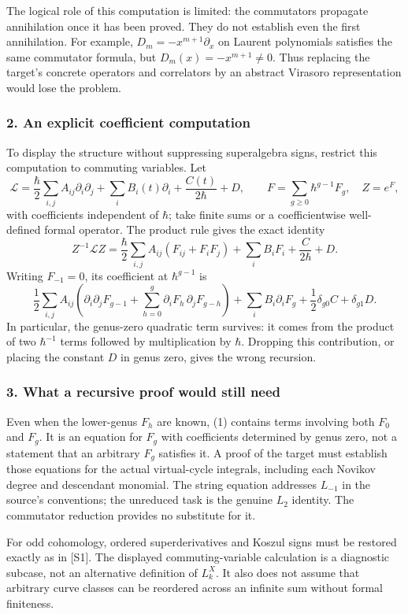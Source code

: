 \documentclass[11pt]{article}
\begin{document}
The logical role of this computation is limited: the commutators propagate annihilation once it has been proved. They do not establish even the first annihilation. For example, $D_m=-x^{m+1}\partial_x$ on Laurent polynomials satisfies the same commutator formula, but $D_m(x)=-x^{m+1}\ne0$. Thus replacing the target's concrete operators and correlators by an abstract Virasoro representation would lose the problem.

\subsubsection{2. An explicit coefficient computation}
To display the structure without suppressing superalgebra signs, restrict this computation to commuting variables. Let
\[\mathcal L=\frac{\hbar}{2}\sum_{i,j}A_{ij}\partial_i\partial_j+
\sum_i B_i(t)\partial_i+\frac{C(t)}{2\hbar}+D,\qquad
F=\sum_{g\ge0}\hbar^{g-1}F_g,\quad Z=e^F,\]
with coefficients independent of $\hbar$; take finite sums or a coefficientwise well-defined formal operator. The product rule gives the exact identity
\[Z^{-1}\mathcal L Z=\frac{\hbar}{2}\sum_{i,j}A_{ij}(F_{ij}+F_iF_j)+\sum_i B_iF_i+
\frac{C}{2\hbar}+D.\]
Writing $F_{-1}=0$, its coefficient at $\hbar^{g-1}$ is
\[\frac12\sum_{i,j}A_{ij}\left(\partial_i\partial_jF_{g-1}+
\sum_{h=0}^{g}\partial_iF_h\,\partial_jF_{g-h}\right)
+\sum_i B_i\partial_iF_g+\frac12\delta_{g0}C+\delta_{g1}D.\tag{1}\]
In particular, the genus-zero quadratic term survives: it comes from the product of two $\hbar^{-1}$ terms followed by multiplication by $\hbar$. Dropping this contribution, or placing the constant $D$ in genus zero, gives the wrong recursion.

\subsubsection{3. What a recursive proof would still need}
Even when the lower-genus $F_h$ are known, (1) contains terms involving both $F_0$ and $F_g$. It is an equation for $F_g$ with coefficients determined by genus zero, not a statement that an arbitrary $F_g$ satisfies it. A proof of the target must establish those equations for the actual virtual-cycle integrals, including each Novikov degree and descendant monomial. The string equation addresses $L_{-1}$ in the source's conventions; the unreduced task is the genuine $L_2$ identity. The commutator reduction provides no substitute for it.

For odd cohomology, ordered superderivatives and Koszul signs must be restored exactly as in [S1]. The displayed commuting-variable calculation is a diagnostic subcase, not an alternative definition of $L_k^X$. It also does not assume that arbitrary curve classes can be reordered across an infinite sum without formal finiteness.
\end{document}
